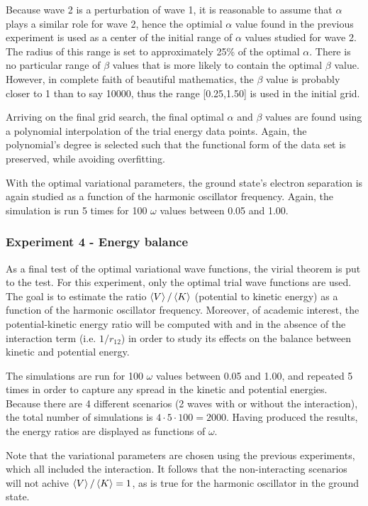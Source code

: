\documentclass[nofootinbib,reprint,english]{revtex4-1}
\begin{document}
Because wave 2 is a perturbation of wave 1, it is reasonable to assume that \(\alpha\) plays a similar role for wave 2, hence the optimial \(\alpha\) value found in the previous experiment is used as a center of the initial range of \(\alpha\) values studied for wave 2. The radius of this range is set to approximately 25\% of the optimal \(\alpha\). There is no particular range of \(\beta\) values that is more likely to contain the optimal \(\beta\) value. However, in complete faith of beautiful mathematics, the \(\beta\) value is probably closer to 1 than to say 10000, thus the range [0.25,1.50] is used in the initial grid.

Arriving on the final grid search, the final optimal \(\alpha\) and \(\beta\) values are found using a polynomial interpolation of the trial energy data points. Again, the polynomial's degree is selected such that the functional form of the data set is preserved, while avoiding overfitting.

With the optimal variational parameters, the ground state's electron separation is again studied as a function of the harmonic oscillator frequency. Again, the simulation is run 5 times for 100 \(\omega\) values between 0.05 and 1.00.
\subsubsection{Experiment 4 - Energy balance}
As a final test of the optimal variational wave functions, the virial theorem is put to the test. For this experiment, only the optimal trial wave functions are used. The goal is to estimate the ratio \(\expval{V}/\expval{K}\) (potential to kinetic energy) as a function of the harmonic oscillator frequency. Moreover, of academic interest, the potential-kinetic energy ratio will be computed with and in the absence of the interaction term (i.e. \(1/r_{12}\)) in order to study its effects on the balance between kinetic and potential energy.

The simulations are run for 100 \(\omega\) values between 0.05 and 1.00, and repeated 5 times in order to capture any spread in the kinetic and potential energies. Because there are 4 different scenarios (2 waves with or without the interaction), the total number of simulations is \(4\cdot5\cdot100=2000\). Having produced the results, the energy ratios are displayed as functions of \(\omega\).

Note that the variational parameters are chosen using the previous experiments, which all included the interaction. It follows that the non-interacting scenarios will not achive \(\expval{V}/\expval{K}=1\), as is true for the harmonic oscillator in the ground state.
\end{document}
